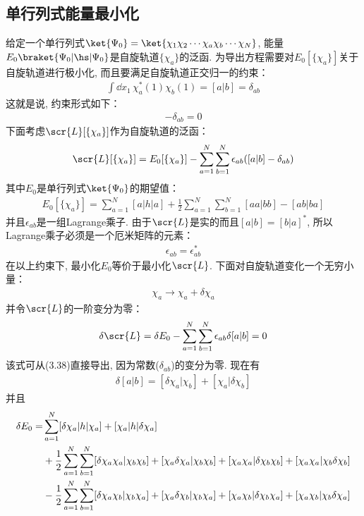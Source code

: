 \subsection{单行列式能量最小化}
给定一个单行列式$\ket{\Psi_0} = \ket{\chi_1\chi_2\cdots\chi_a\chi_b\cdots\chi_N}$, 
能量$E_0\braket{\Psi_0|\hs|\Psi_0}$是自旋轨道$\{\chi_a\}$的泛函. 
为导出\hft 方程需要对$E_0[\{\chi_a \}]$关于自旋轨道进行极小化, 
而且要满足自旋轨道正交归一的约束：
\begin{align}
	\int\dd{x}_1\,\chi_a^*(1)\chi_b(1) = [a|b] = \delta_{ab}
\end{align}
这就是说, 
约束形式如下：
\begin{align}
	[a|b] - \delta_{ab} = 0
\end{align}
下面考虑$\scr{L}[\{\chi_a \}]$作为自旋轨道的泛函：
\begin{align}
	\scr{L}[\{\chi_a \}] = E_0[\{\chi_a\}] - \sum_{a=1}^{N}\sum_{b=1}^{N}\epsilon_{ab}([a|b]-\delta_{ab})
\end{align}
其中$E_0$是单行列式$\ket{\Psi_0}$的期望值：
\begin{align}
	E_0[\{\chi_a\}] = \sum_{a=1}^{N}[a|h|a] + \frac{1}{2}\sum_{a=1}^{N}\sum_{b=1}^{N}[aa|bb]- [ab|ba]
\end{align}
并且$\epsilon_{ab}$是一组Lagrange乘子. 
由于$\scr{L}$是实的而且$[a|b]=[b|a]^*$, 
所以Lagrange乘子必须是一个厄米矩阵的元素：
\begin{align}
	\label{3.40}
	\epsilon_{ab} = \epsilon_{ab}^*
\end{align}
在以上约束下, 
最小化$E_0$等价于最小化$\scr{L}$. 
下面对自旋轨道变化一个无穷小量：
\begin{align}
	\chi_a \to \chi_a+\delta\chi_a
\end{align}
并令$\scr{L}$的一阶变分为零：
\begin{align}
	\delta\scr{L} = \delta E_0 - \sum_{a=1}^{N}\sum_{b=1}^{N}\epsilon_{ab}\delta[a|b] = 0
\end{align}
该式可从(3.38)直接导出, 
因为常数($\delta_{ab}$)的变分为零. 
现在有
\begin{align}
	\delta[a|b] = [\delta\chi_a|\chi_b] + [\chi_a|\delta\chi_b]
\end{align}
并且
\begin{align}
	\delta E_0 = & \sum_{a=1}^{N}[\delta\chi_a|h|\chi_a] + [\chi_a|h|\delta\chi_a]\notag\\
	& + \frac{1}{2}\sum_{a=1}^{N}\sum_{b=1}^{N}[\delta\chi_a\chi_a|\chi_b\chi_b] + [\chi_a\delta\chi_a|\chi_b\chi_b] + [\chi_a\chi_a|\delta\chi_b\chi_b] + [\chi_a\chi_a|\chi_b\delta\chi_b]\notag\\
	& - \frac{1}{2}\sum_{a=1}^{N}\sum_{b=1}^{N}[\delta\chi_a\chi_b|\chi_b\chi_a] + [\chi_a\delta\chi_b|\chi_b\chi_a] + [\chi_a\chi_b|\delta\chi_b\chi_a] + [\chi_a\chi_b|\chi_b\delta\chi_a]
\end{align}

